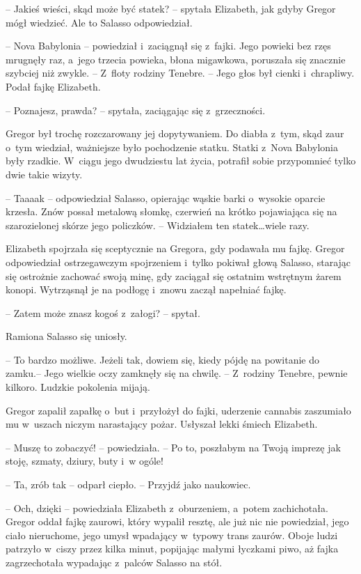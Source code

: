 \documentclass[oneside,polish,12pt,sfheadings]{mwbk}
\begin{document}
-- Jakieś wieści, skąd może być statek? -- spytała Elizabeth, jak gdyby
Gregor mógł wiedzieć. Ale to Salasso odpowiedział.

-- Nova Babylonia -- powiedział i~zaciągnął się z~fajki. Jego powieki bez
rzęs mrugnęły raz, a~jego trzecia powieka, błona migawkowa, poruszała
się znacznie szybciej niż zwykle. -- Z~floty rodziny Tenebre. -- Jego głos
był cienki i~chrapliwy. Podał fajkę Elizabeth.

-- Poznajesz, prawda? -- spytała, zaciągając się z~grzeczności.

Gregor był trochę rozczarowany jej dopytywaniem. Do diabła z~tym, skąd
zaur o~tym wiedział, ważniejsze było pochodzenie statku. Statki z~Nova
Babylonia były rzadkie. W~ciągu jego dwudziestu lat życia, potrafił
sobie przypomnieć tylko dwie takie wizyty.

-- Taaaak -- odpowiedział Salasso, opierając wąskie barki o~wysokie
oparcie krzesła. Znów possał metalową słomkę, czerwień na krótko
pojawiająca się na szarozielonej skórze jego policzków. -- Widziałem ten
statek\ldots wiele razy.

Elizabeth spojrzała się sceptycznie na Gregora, gdy podawała mu fajkę.
Gregor odpowiedział ostrzegawczym spojrzeniem i~tylko pokiwał głową
Salasso, starając się ostrożnie zachować swoją minę, gdy zaciągał się
ostatnim wstrętnym żarem konopi. Wytrząsnął je na podłogę i~znowu
zaczął napełniać fajkę.

-- Zatem może znasz kogoś z~załogi? -- spytał.

Ramiona Salasso się uniosły. 

-- To bardzo możliwe. Jeżeli tak, dowiem
się, kiedy pójdę na powitanie do zamku.-- Jego wielkie oczy zamknęły się
na chwilę. -- Z~rodziny Tenebre, pewnie kilkoro. Ludzkie pokolenia
mijają.

Gregor zapalił zapałkę o~but i~przyłożył do fajki, uderzenie cannabis
zaszumiało mu w~uszach niczym narastający pożar. Usłyszał lekki śmiech
Elizabeth.

-- Muszę to zobaczyć! -- powiedziała. -- Po to, poszłabym na Twoją imprezę
jak stoję, szmaty, dziury, buty i~w ogóle!

-- Ta, zrób tak -- odparł ciepło. -- Przyjdź jako naukowiec.

-- Och, dzięki -- powiedziała Elizabeth z~oburzeniem, a~potem
zachichotała. Gregor oddał fajkę zaurowi, który wypalił resztę, ale już
nic nie powiedział, jego ciało nieruchome, jego umysł wpadający w~typowy
trans zaurów. Oboje ludzi patrzyło w~ciszy przez kilka minut, popijając
małymi łyczkami piwo, aż fajka zagrzechotała wypadając z~palców Salasso
na stół.
\end{document}
